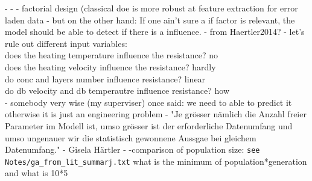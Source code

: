 
- 
- 
- factorial design (classical \gls{doe} is more robust at feature extraction for error laden data \cite{giunta2003overview}
-
but on the other hand: If one ain't sure a if factor is relevant, the model should be able to detect if there is a influence. - from Haertler2014?
- let's rule out different input variables: \\
does the heating temperature influence the resistance?  no \\
does the heating velocity influence the resistance?  hardly\\
do conc and layers number influence resistance? linear \\
do db velocity and db temperautre influence resistance? how\\
- somebody very wise (my superviser) once said: we need to able to predict it otherwise it is just an engineering problem 
- "Je grösser nämlich die Anzahl freier Parameter im Modell ist, umso grösser ist der erforderliche Datenumfang und umso ungenauer wir die statistisch gewonnene Aussgae bei gleichem Datenumfang." - Gisela Härtler\cite{haertler2014statistisch}
- 
-comparison of population size: 
\verb|see Notes/ga_from_lit_summarj.txt|
what is the minimum of population*generation and what is 10*5 

